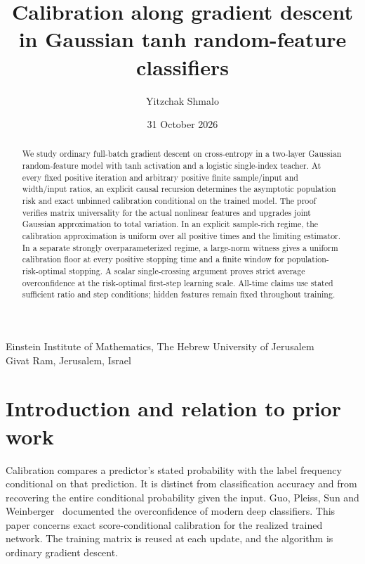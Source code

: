 \documentclass[
  11pt,
  a4paper,
]{article}
\title{Calibration along gradient descent in Gaussian tanh
random-feature classifiers}
\author{Yitzchak Shmalo}
\date{31 October 2026}
\begin{document}
\maketitle

\begin{center}
\small Einstein Institute of Mathematics, The Hebrew University of Jerusalem\\
Givat Ram, Jerusalem, Israel
\end{center}

\begin{abstract}
We study ordinary full-batch gradient descent on cross-entropy in a
two-layer Gaussian random-feature model with tanh activation and a
logistic single-index teacher. At every fixed positive iteration and
arbitrary positive finite sample/input and width/input ratios, an explicit
causal recursion determines the asymptotic population risk and exact
unbinned calibration conditional on the trained model. The proof verifies
matrix universality for the actual nonlinear features and upgrades joint
Gaussian approximation to total variation. In an explicit sample-rich
regime, the calibration approximation is uniform over all positive times
and the limiting estimator. In a separate strongly overparameterized
regime, a large-norm witness gives a uniform calibration floor at every
positive stopping time and a finite window for population-risk-optimal
stopping. A scalar single-crossing argument proves strict average
overconfidence at the risk-optimal first-step learning scale. All-time
claims use stated sufficient ratio and step conditions; hidden features
remain fixed throughout training.
\end{abstract}

\clearpage
\setcounter{tocdepth}{1}
\tableofcontents
\clearpage

\hypertarget{introduction-and-relation-to-prior-work}{%
\section{Introduction and relation to prior
work}\label{introduction-and-relation-to-prior-work}}

Calibration compares a predictor's stated probability with the label
frequency conditional on that prediction. It is distinct from
classification accuracy and from recovering the entire conditional
probability given the input. Guo, Pleiss, Sun and Weinberger~\cite{GuoCalib2017}
documented the overconfidence of modern deep classifiers. This paper concerns exact score-conditional
calibration for the realized trained network. The training matrix is
reused at each update, and the algorithm is ordinary gradient descent.
\end{document}
